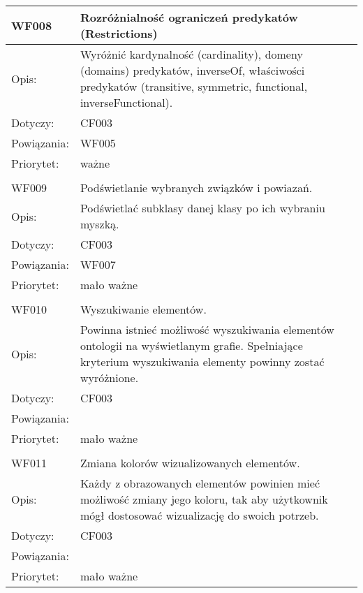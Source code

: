 \begin{center}
\begin{longtable}{|m{3cm}|m{9cm}|}
WF008 & Rozróżnialność ograniczeń predykatów (Restrictions) \\ \hline
Opis: & Wyróżnić kardynalność (cardinality), domeny (domains) predykatów, inverseOf, właściwości predykatów (transitive, symmetric, 
functional, inverseFunctional). \\ \hline
Dotyczy: &  CF003\\ \hline
Powiązania: & WF005\\ \hline
Priorytet: & ważne \\ \hline

\multicolumn{2}{c}{} \\
 \hline

WF009 &  Podświetlanie wybranych związków i powiazań.\\ \hline
Opis: &   Podświetlać subklasy danej klasy po ich wybraniu myszką. \\ \hline
Dotyczy: &  CF003\\ \hline
Powiązania: & WF007\\ \hline
Priorytet: & mało ważne \\ \hline


\multicolumn{2}{c}{} \\
 \hline

WF010 &  Wyszukiwanie elementów.\\ \hline
Opis: &   Powinna istnieć możliwość wyszukiwania elementów ontologii na wyświetlanym grafie. Spełniające kryterium wyszukiwania elementy powinny 
zostać wyróżnione.  \\ \hline
Dotyczy: &  CF003\\ \hline
Powiązania: & \\ \hline
Priorytet: & mało ważne \\ \hline

\multicolumn{2}{c}{} \\
 \hline

WF011 &  Zmiana kolorów wizualizowanych elementów.\\ \hline
Opis: &  Każdy z obrazowanych elementów powinien mieć możliwość zmiany jego koloru, tak aby użytkownik mógł dostosować wizualizację do swoich potrzeb.  \\ \hline
Dotyczy: &  CF003\\ \hline
Powiązania: &\\ \hline
Priorytet: & mało ważne \\ \hline


\end{longtable}

\end{center}






